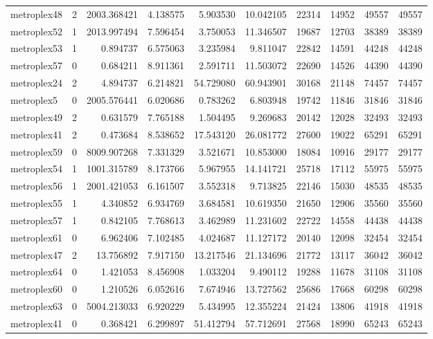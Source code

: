 \begin{longtable}{|l|r|r|r|r|r|r|r|r|r|}
metroplex48 & 2 & 2003.368421 & 4.138575 & 5.903530 & 10.042105 & 22314 & 14952 & 49557 & 49557 \\
metroplex52 & 1 & 2013.997494 & 7.596454 & 3.750053 & 11.346507 & 19687 & 12703 & 38389 & 38389 \\
metroplex53 & 1 & 0.894737 & 6.575063 & 3.235984 & 9.811047 & 22842 & 14591 & 44248 & 44248 \\
metroplex57 & 0 & 0.684211 & 8.911361 & 2.591711 & 11.503072 & 22690 & 14526 & 44390 & 44390 \\
metroplex24 & 2 & 4.894737 & 6.214821 & 54.729080 & 60.943901 & 30168 & 21148 & 74457 & 74457 \\
metroplex5 & 0 & 2005.576441 & 6.020686 & 0.783262 & 6.803948 & 19742 & 11846 & 31846 & 31846 \\
metroplex49 & 2 & 0.631579 & 7.765188 & 1.504495 & 9.269683 & 20142 & 12028 & 32493 & 32493 \\
metroplex41 & 2 & 0.473684 & 8.538652 & 17.543120 & 26.081772 & 27600 & 19022 & 65291 & 65291 \\
metroplex59 & 0 & 8009.907268 & 7.331329 & 3.521671 & 10.853000 & 18084 & 10916 & 29177 & 29177 \\
metroplex54 & 1 & 1001.315789 & 8.173766 & 5.967955 & 14.141721 & 25718 & 17112 & 55975 & 55975 \\
metroplex56 & 1 & 2001.421053 & 6.161507 & 3.552318 & 9.713825 & 22146 & 15030 & 48535 & 48535 \\
metroplex55 & 1 & 4.340852 & 6.934769 & 3.684581 & 10.619350 & 21650 & 12906 & 35560 & 35560 \\
metroplex57 & 1 & 0.842105 & 7.768613 & 3.462989 & 11.231602 & 22722 & 14558 & 44438 & 44438 \\
metroplex61 & 0 & 6.962406 & 7.102485 & 4.024687 & 11.127172 & 20140 & 12098 & 32454 & 32454 \\
metroplex47 & 2 & 13.756892 & 7.917150 & 13.217546 & 21.134696 & 21772 & 13117 & 36042 & 36042 \\
metroplex64 & 0 & 1.421053 & 8.456908 & 1.033204 & 9.490112 & 19288 & 11678 & 31108 & 31108 \\
metroplex60 & 0 & 1.210526 & 6.052616 & 7.674946 & 13.727562 & 25686 & 17668 & 60298 & 60298 \\
metroplex63 & 0 & 5004.213033 & 6.920229 & 5.434995 & 12.355224 & 21424 & 13806 & 41918 & 41918 \\
metroplex41 & 0 & 0.368421 & 6.299897 & 51.412794 & 57.712691 & 27568 & 18990 & 65243 & 65243 \\

\end{longtable}

